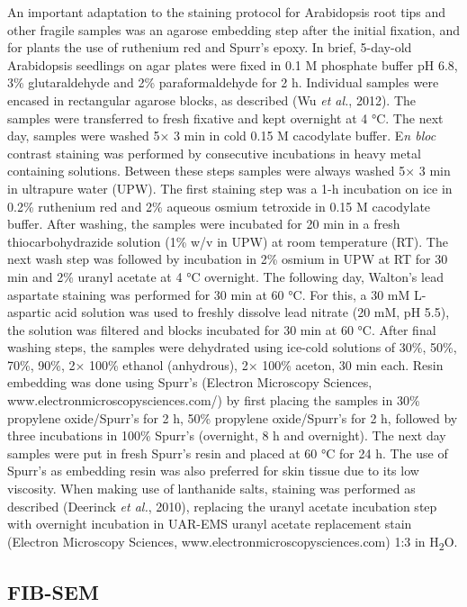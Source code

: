\documentclass{article}
\begin{document}
An important adaptation to the staining protocol for Arabidopsis root tips and other fragile samples was an agarose embedding step after the initial fixation, and for plants the use of ruthenium red and Spurr’s epoxy. In brief, 5-day-old Arabidopsis seedlings on agar plates were fixed in 0.1 M phosphate buffer pH 6.8, 3\% glutaraldehyde and 2\% paraformaldehyde for 2 h. Individual samples were encased in rectangular agarose blocks, as described (Wu \textit{et al.}, 2012). The samples were transferred to fresh fixative and kept overnight at 4 °C. The next day, samples were washed 5× 3 min in cold 0.15 M cacodylate buffer. E\textit{n bloc} contrast staining was performed by consecutive incubations in heavy metal containing solutions. Between these steps samples were always washed 5× 3 min in ultrapure water (UPW). The first staining step was a 1-h incubation on ice in 0.2\% ruthenium red and 2\% aqueous osmium tetroxide in 0.15 M cacodylate buffer. After washing, the samples were incubated for 20 min in a fresh thiocarbohydrazide solution (1\% w/v in UPW) at room temperature (RT). The next wash step was followed by incubation in 2\% osmium in UPW at RT for 30 min and 2\% uranyl acetate at 4 °C overnight. The following day, Walton’s lead aspartate staining was performed for 30 min at 60 °C. For this, a 30 mM L-aspartic acid solution was used to freshly dissolve lead nitrate (20 mM, pH 5.5), the solution was filtered and blocks incubated for 30 min at 60 °C. After final washing steps, the samples were dehydrated using ice-cold solutions of 30\%, 50\%, 70\%, 90\%, 2× 100\% ethanol (anhydrous), 2× 100\% aceton, 30 min each. Resin embedding was done using Spurr’s (Electron Microscopy Sciences, www.electronmicroscopysciences.com/) by first placing the samples in 30\% propylene oxide/Spurr’s for 2 h, 50\% propylene oxide/Spurr’s for 2 h, followed by three incubations in 100\% Spurr’s (overnight, 8 h and overnight). The next day samples were put in fresh Spurr’s resin and placed at 60 °C for 24 h. The use of Spurr’s as embedding resin was also preferred for skin tissue due to its low viscosity. When making use of lanthanide salts, staining was performed as described (Deerinck \textit{et al.}, 2010), replacing the uranyl acetate incubation step with overnight incubation in UAR-EMS uranyl acetate replacement stain (Electron Microscopy Sciences, www.electronmicroscopysciences.com) 1:3 in H\textsubscript{2}O.

\subsection*{FIB-SEM}
\end{document}
